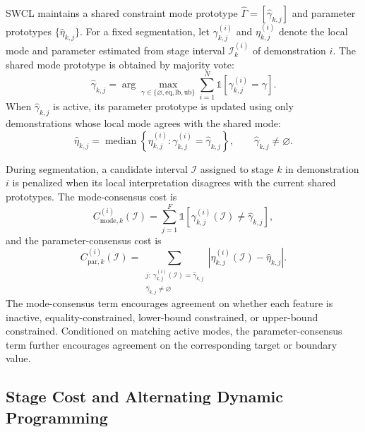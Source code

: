 \documentclass[lettersize,journal]{IEEEtran}
\begin{document}
SWCL maintains a shared constraint mode prototype $\hat{\Gamma}=[\hat{\gamma}_{k,j}]$ and parameter prototypes $\{\hat{\eta}_{k,j}\}$. For a fixed segmentation, let $\gamma_{k,j}^{(i)}$ and $\eta_{k,j}^{(i)}$ denote the local mode and parameter estimated from stage interval $\mathcal{I}_k^{(i)}$ of demonstration $i$. The shared mode prototype is obtained by majority vote:
\begin{equation}
\hat{\gamma}_{k,j}
=
\arg\max_{\gamma\in\{\varnothing,\mathrm{eq},\mathrm{lb},\mathrm{ub}\}}
\sum_{i=1}^{N}
\mathds{1}\!\left[
\gamma_{k,j}^{(i)}=\gamma
\right].
\label{eq:mode_consensus_update}
\end{equation}
When $\hat{\gamma}_{k,j}$ is active, its parameter prototype is updated using only demonstrations whose local mode agrees with the shared mode:
\begin{equation}
\hat{\eta}_{k,j}
=
\operatorname{median}
\left\{
\eta_{k,j}^{(i)}
:
\gamma_{k,j}^{(i)}=\hat{\gamma}_{k,j}
\right\},
\qquad
\hat{\gamma}_{k,j}\neq\varnothing.
\label{eq:param_consensus_update}
\end{equation}

During segmentation, a candidate interval $\mathcal{I}$ assigned to stage $k$ in demonstration $i$ is penalized when its local interpretation disagrees with the current shared prototypes. The mode-consensus cost is
\begin{equation}
C_{\mathrm{mode},k}^{(i)}(\mathcal{I})
=
\sum_{j=1}^{F}
\mathds{1}
\left[
\gamma_{k,j}^{(i)}(\mathcal{I})
\neq
\hat{\gamma}_{k,j}
\right],
\label{eq:mode_consensus_cost}
\end{equation}
and the parameter-consensus cost is
\begin{equation}
C_{\mathrm{par},k}^{(i)}(\mathcal{I})
=
\sum_{\substack{
j:\,
\gamma_{k,j}^{(i)}(\mathcal{I})=\hat{\gamma}_{k,j}\\
\hat{\gamma}_{k,j}\neq\varnothing
}}
\left|
\eta_{k,j}^{(i)}(\mathcal{I})
-
\hat{\eta}_{k,j}
\right|.
\label{eq:param_consensus_cost}
\end{equation}
The mode-consensus term encourages agreement on whether each feature is inactive, equality-constrained, lower-bound constrained, or upper-bound constrained. Conditioned on matching active modes, the parameter-consensus term further encourages agreement on the corresponding target or boundary value.

\subsection{Stage Cost and Alternating Dynamic Programming}
\label{sec:alternating_dp}
\end{document}
